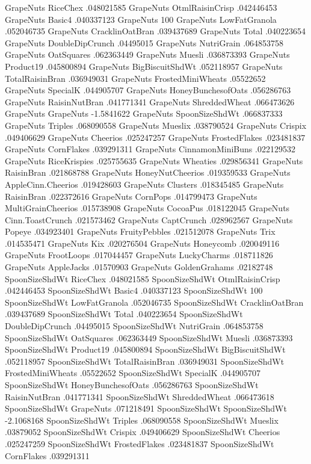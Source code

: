 GrapeNuts	RiceChex	.048021585
GrapeNuts	OtmlRaisinCrisp	.042446453
GrapeNuts	Basic4	.040337123
GrapeNuts	100%
GrapeNuts	LowFatGranola	.052046735
GrapeNuts	CracklinOatBran	.039437689
GrapeNuts	Total	.040223654
GrapeNuts	DoubleDipCrunch	.04495015
GrapeNuts	NutriGrain	.064853758
GrapeNuts	OatSquares	.062363449
GrapeNuts	Muesli	.036873393
GrapeNuts	Product19	.045800894
GrapeNuts	BigBiscuitShdWt	.052118957
GrapeNuts	TotalRaisinBran	.036949031
GrapeNuts	FrostedMiniWheats	.05522652
GrapeNuts	SpecialK	.044905707
GrapeNuts	HoneyBunchesofOats	.056286763
GrapeNuts	RaisinNutBran	.041771341
GrapeNuts	ShreddedWheat	.066473626
GrapeNuts	GrapeNuts	-1.5841622
GrapeNuts	SpoonSizeShdWt	.066837333
GrapeNuts	Triples	.068090558
GrapeNuts	Mueslix	.038790524
GrapeNuts	Crispix	.049406629
GrapeNuts	Cheerios	.025247257
GrapeNuts	FrostedFlakes	.023481837
GrapeNuts	CornFlakes	.039291311
GrapeNuts	CinnamonMiniBuns	.022129532
GrapeNuts	RiceKrispies	.025755635
GrapeNuts	Wheaties	.029856341
GrapeNuts	RaisinBran	.021868788
GrapeNuts	HoneyNutCheerios	.019359533
GrapeNuts	AppleCinn.Cheerios	.019428603
GrapeNuts	Clusters	.018345485
GrapeNuts	RaisinBran	.022372616
GrapeNuts	CornPops	.014799473
GrapeNuts	MultiGrainCheerios	.015738908
GrapeNuts	CocoaPus	.018122045
GrapeNuts	Cinn.ToastCrunch	.021573462
GrapeNuts	CaptCrunch	.028962567
GrapeNuts	Popeye	.034923401
GrapeNuts	FruityPebbles	.021512078
GrapeNuts	Trix	.014535471
GrapeNuts	Kix	.020276504
GrapeNuts	Honeycomb	.020049116
GrapeNuts	FrootLoops	.017044457
GrapeNuts	LuckyCharms	.018711826
GrapeNuts	AppleJacks	.01570903
GrapeNuts	GoldenGrahams	.02182748
SpoonSizeShdWt	RiceChex	.048021585
SpoonSizeShdWt	OtmlRaisinCrisp	.042446453
SpoonSizeShdWt	Basic4	.040337123
SpoonSizeShdWt	100%
SpoonSizeShdWt	LowFatGranola	.052046735
SpoonSizeShdWt	CracklinOatBran	.039437689
SpoonSizeShdWt	Total	.040223654
SpoonSizeShdWt	DoubleDipCrunch	.04495015
SpoonSizeShdWt	NutriGrain	.064853758
SpoonSizeShdWt	OatSquares	.062363449
SpoonSizeShdWt	Muesli	.036873393
SpoonSizeShdWt	Product19	.045800894
SpoonSizeShdWt	BigBiscuitShdWt	.052118957
SpoonSizeShdWt	TotalRaisinBran	.036949031
SpoonSizeShdWt	FrostedMiniWheats	.05522652
SpoonSizeShdWt	SpecialK	.044905707
SpoonSizeShdWt	HoneyBunchesofOats	.056286763
SpoonSizeShdWt	RaisinNutBran	.041771341
SpoonSizeShdWt	ShreddedWheat	.066473618
SpoonSizeShdWt	GrapeNuts	.071218491
SpoonSizeShdWt	SpoonSizeShdWt	-2.1068168
SpoonSizeShdWt	Triples	.068090558
SpoonSizeShdWt	Mueslix	.03879052
SpoonSizeShdWt	Crispix	.049406629
SpoonSizeShdWt	Cheerios	.025247259
SpoonSizeShdWt	FrostedFlakes	.023481837
SpoonSizeShdWt	CornFlakes	.039291311
